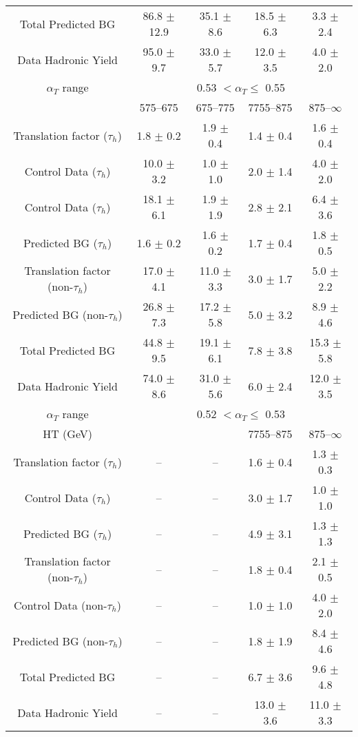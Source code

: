\documentclass[a4paper,12pt]{article}
\begin{document}
\begin{table}[htl]
\begin{flushleft}
\begin{tabular}{ c|cccc }
\hline
Total Predicted BG & 86.8 $\pm$ 12.9  & 35.1 $\pm$ 8.6  & 18.5 $\pm$ 6.3  & 3.3 $\pm$ 2.4 \\ 
Data Hadronic Yield & 95.0 $\pm$ 9.7  & 33.0 $\pm$ 5.7  & 12.0 $\pm$ 3.5  & 4.0 $\pm$ 2.0 \\ 
\hline
\hline
 $ \alpha_T $ range  &  \multicolumn{4}{c}{0.53 $ < \alpha_T \leq $ 0.55}\\ 
  & 575--675 & 675--775 & 7755--875 & 875--$\infty$ \\ 
 Translation factor ($\tau_h$) & 1.8 $\pm$ 0.2  & 1.9 $\pm$ 0.4  & 1.4 $\pm$ 0.4  & 1.6 $\pm$ 0.4 \\ 
Control Data ($\tau_h$) & 10.0 $\pm$ 3.2  & 1.0 $\pm$ 1.0  & 2.0 $\pm$ 1.4  & 4.0 $\pm$ 2.0 \\ 
Control Data ($\tau_h$) & 18.1 $\pm$ 6.1  & 1.9 $\pm$ 1.9  & 2.8 $\pm$ 2.1  & 6.4 $\pm$ 3.6 \\ 
\hline
Predicted BG ($\tau_h$) & 1.6 $\pm$ 0.2  & 1.6 $\pm$ 0.2  & 1.7 $\pm$ 0.4  & 1.8 $\pm$ 0.5 \\ 
Translation factor (non-$\tau_h$) & 17.0 $\pm$ 4.1  & 11.0 $\pm$ 3.3  & 3.0 $\pm$ 1.7  & 5.0 $\pm$ 2.2 \\ 
Predicted BG (non-$\tau_h$) & 26.8 $\pm$ 7.3  & 17.2 $\pm$ 5.8  & 5.0 $\pm$ 3.2  & 8.9 $\pm$ 4.6 \\ 
\hline
Total Predicted BG & 44.8 $\pm$ 9.5  & 19.1 $\pm$ 6.1  & 7.8 $\pm$ 3.8  & 15.3 $\pm$ 5.8 \\ 
Data Hadronic Yield & 74.0 $\pm$ 8.6  & 31.0 $\pm$ 5.6  & 6.0 $\pm$ 2.4  & 12.0 $\pm$ 3.5 \\ 
\hline
\hline
 $ \alpha_T $ range &  \multicolumn{4}{c}{0.52 $ < \alpha_T \leq $ 0.53}\\ 
  HT (GeV) &  &  & 7755--875 & 875--$\infty$ \\ 
 Translation factor ($\tau_h$) & --  & --  & 1.6 $\pm$ 0.4  & 1.3 $\pm$ 0.3 \\ 
Control Data ($\tau_h$) & --  & --  & 3.0 $\pm$ 1.7  & 1.0 $\pm$ 1.0 \\ 
Predicted BG ($\tau_h$) & --  & --  & 4.9 $\pm$ 3.1  & 1.3 $\pm$ 1.3 \\ 
\hline
Translation factor (non-$\tau_h$) & --  & --  & 1.8 $\pm$ 0.4  & 2.1 $\pm$ 0.5 \\ 
Control Data (non-$\tau_h$) & --  & --  & 1.0 $\pm$ 1.0  & 4.0 $\pm$ 2.0 \\ 
Predicted BG (non-$\tau_h$) & --  & --  & 1.8 $\pm$ 1.9  & 8.4 $\pm$ 4.6 \\ 
\hline
Total Predicted BG & --  & --  & 6.7 $\pm$ 3.6  & 9.6 $\pm$ 4.8 \\ 
Data Hadronic Yield & --  & --  & 13.0 $\pm$ 3.6  & 11.0 $\pm$ 3.3 \\ 
\hline
 \end{tabular}
 \end{flushleft}
\label{tab:bg-esti-tauhad}
 \end{table}
\end{document}
